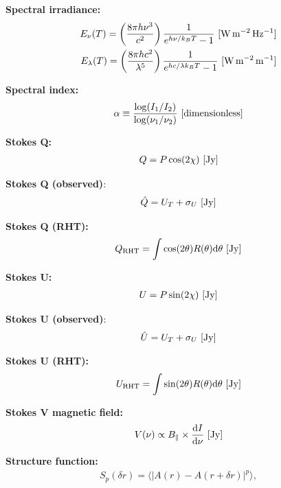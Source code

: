 \documentclass[a4paper,10pt]{article}
\begin{document}
{\noindent}\textbf{Spectral irradiance:}
\begin{align*}
    E_\nu(T) = \left(\frac{8\pi h\nu^3}{c^2}\right) \frac{1}{e^{h\nu/k_BT}-1} ~ [{\rm W\,m^{-2}\,Hz^{-1}}] \\
    E_\lambda(T) = \left(\frac{8\pi hc^2}{\lambda^5}\right) \frac{1}{e^{hc/\lambda k_BT}-1} ~ [{\rm W\,m^{-2}\,m^{-1}}]
\end{align*}

{\noindent}\textbf{Spectral index:}
\begin{align*}
    \alpha \equiv \frac{\log(I_1/I_2)}{\log(\nu_1/\nu_2)} ~ [{\rm dimensionless}]
\end{align*}

{\noindent}\textbf{Stokes Q:}
\begin{align*}
    Q = P\cos(2\chi) ~ [{\rm Jy}]
\end{align*}

{\noindent}\textbf{Stokes Q (observed)}:
\begin{align*}
    \hat{Q} = U_T + \sigma_U ~ [{\rm Jy}]
\end{align*}

{\noindent}\textbf{Stokes Q (RHT):}
\begin{align*}
    Q_\mathrm{RHT} = \int\cos(2\theta)R(\theta)\mathrm{d}\theta ~ [{\rm Jy}]
\end{align*}

{\noindent}\textbf{Stokes U:}
\begin{align*}
    U = P\sin(2\chi) ~ [{\rm Jy}]
\end{align*}

{\noindent}\textbf{Stokes U (observed)}:
\begin{align*}
    \hat{U} = U_T + \sigma_U ~ [{\rm Jy}]
\end{align*}

{\noindent}\textbf{Stokes U (RHT):}
\begin{align*}
    U_\mathrm{RHT} = \int\sin(2\theta)R(\theta)\mathrm{d}\theta ~ [{\rm Jy}]
\end{align*}

{\noindent}\textbf{Stokes V magnetic field:}
\begin{align*}
    V(\nu) \propto B_\parallel \times \frac{\mathrm{d}I}{\mathrm{d}\nu} ~ [\rm Jy]
\end{align*}

{\noindent}\textbf{Structure function:}
\begin{align*}
    S_p(\delta r) = \langle\lvert A(r)-A(r+\delta r)\rvert^p\rangle,
\end{align*}
\end{document}
